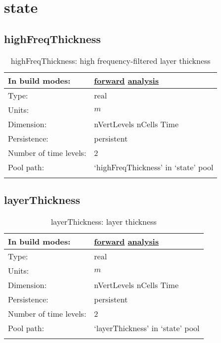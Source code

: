 \section[state]{state}
\label{sec:var_sec_state}
\subsection[highFreqThickness]{highFreqThickness}
\label{subsec:var_sec_state_highFreqThickness}
\begin{center}
\begin{longtable}{| p{2.0in} | p{4.0in} |}
        \hline 
        In build modes: & \hyperref[subsec:forward_var_tab_state]{forward} \hyperref[subsec:analysis_var_tab_state]{analysis} \\
        \hline 
        Type: & real \\
        \hline 
        Units: & $m$ \\
        \hline 
        Dimension: & nVertLevels nCells Time \\
        \hline 
        Persistence: & persistent \\
        \hline 
        Number of time levels: & 2 \\
        \hline 
            Pool path: & `highFreqThickness' in `state' pool \\
		 \hline 
    \caption{highFreqThickness: high frequency-filtered layer thickness}
\end{longtable}
\end{center}
\subsection[layerThickness]{layerThickness}
\label{subsec:var_sec_state_layerThickness}
\begin{center}
\begin{longtable}{| p{2.0in} | p{4.0in} |}
        \hline 
        In build modes: & \hyperref[subsec:forward_var_tab_state]{forward} \hyperref[subsec:analysis_var_tab_state]{analysis} \\
        \hline 
        Type: & real \\
        \hline 
        Units: & $m$ \\
        \hline 
        Dimension: & nVertLevels nCells Time \\
        \hline 
        Persistence: & persistent \\
        \hline 
        Number of time levels: & 2 \\
        \hline 
            Pool path: & `layerThickness' in `state' pool \\
		 \hline 
    \caption{layerThickness: layer thickness}
\end{longtable}
\end{center}
